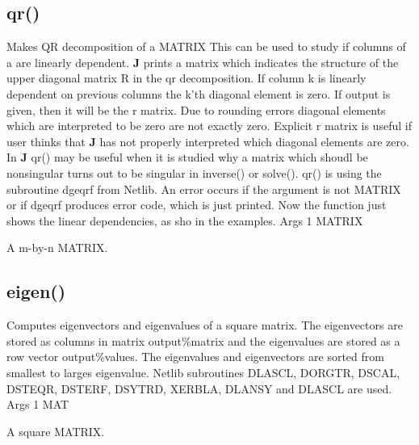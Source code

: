 \subsection{\textcolor{VioletRed}{qr}()}
\label{qr}
Makes QR decomposition of a MATRIX This can be used to study if columns of a are linearly
dependent. \textbf{J} prints a matrix which indicates the structure of the upper diagonal matrix R in the
qr decomposition. If column k is linearly dependent on previous columns the k’th diagonal
element is zero. If output is given, then it will be the r matrix. Due to rounding errors diagonal
elements which are interpreted to be zero are not exactly zero. Explicit r matrix is useful if user
thinks that \textbf{J} has not properly interpreted which diagonal elements are zero.
In \textbf{J}  \textcolor{VioletRed}{qr}() may be useful when it is studied why a matrix which shoudl
be nonsingular turns out to be singular in \textcolor{VioletRed}{inverse}() or \textcolor{VioletRed}{solve}().
\textcolor{VioletRed}{qr}() is using  the subroutine dgeqrf from Netlib.
An error occurs if the argument is not MATRIX or if dgeqrf produces
error code, which is just printed.
Now the function just shows the linear dependencies, as sho in the examples.
\vspace{0.3cm}
\hline
\vspace{0.3cm}
\noindent Args \tabto{3cm} 1 \tabto{5cm}  MATRIX \tabto{7cm}
\begin{changemargin}{3cm}{0cm}
\noindent A m-by-n MATRIX.
\end {changemargin}
\hline
\vspace{0.2cm}
\subsection{\textcolor{VioletRed}{eigen}()}
\label{eigen}
Computes eigenvectors and eigenvalues of a square matrix. The eigenvectors are stored as
columns in matrix output\%matrix and the eigenvalues are stored as a row vector
output\%values. The eigenvalues and eigenvectors are sorted from smallest to larges eigenvalue.
Netlib subroutines DLASCL, DORGTR, DSCAL, DSTEQR, DSTERF, DSYTRD,
XERBLA, DLANSY and DLASCL are used.
\vspace{0.3cm}
\hline
\vspace{0.3cm}
\noindent Args \tabto{3cm} 1 \tabto{5cm}  MAT \tabto{7cm}
\begin{changemargin}{3cm}{0cm}
\noindent  A square MATRIX.
\end {changemargin}
\hline
\vspace{0.2cm}

